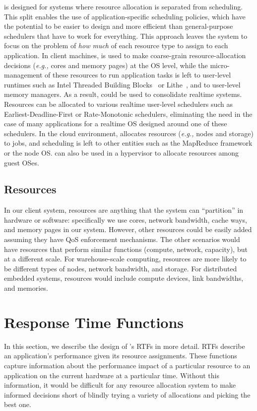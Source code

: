 \pacora is designed for systems where resource allocation is separated
from scheduling.  This split enables the use of application-specific
scheduling policies, which have the potential to be easier to design
and more efficient than general-purpose schedulers that have to work
for everything.  This approach leaves the system to focus on the
problem of \emph{how much} of each resource type to assign to each
application.  In client machines, \pacora is used to make coarse-grain
resource-allocation decisions (\emph{e.g.,} cores and memory pages) at
the OS level, while the micro-management of these resources to run
application tasks is left to user-level runtimes such as Intel
Threaded Building Blocks~\cite{CoMa08} or Lithe~\cite{lithe}, and to
user-level memory managers.
As a result, \pacora could be used to consolidate realtime systems.  Resources can be allocated to various realtime user-level schedulers such as Earliest-Deadline-First or Rate-Monotonic schedulers, eliminating the need in the case of many applications for a realtime OS designed around one of these schedulers.
In the cloud environment, \pacora allocates
resources (\emph{e.g.,} nodes and storage) to jobs, and scheduling is
left to other entities such as the MapReduce framework\cite{mapreduce}
or the node OS.  \pacora can also be used in a hypervisor to allocate
resources among guest OSes.


\subsection{Resources}

In our client system, resources are anything that the system can
``partition'' in hardware or software: specifically we use cores,
network bandwidth, cache ways, and memory pages in our system.
However, other resources could be easily added assuming they have QoS
enforcement mechanisms.  The other scenarios would have resources that
perform similar functions (compute, network, capacity), but at a
different scale. For warehouse-scale computing, resources are more
likely to be different types of nodes, network bandwidth, and
storage. For distributed embedded systems, resources would include
compute devices, link bandwidths, and memories.

\section{Response Time Functions}\label{RTFs}

In this section, we describe the design of \pacora's RTFs in more detail.
RTFs describe an application's performance given its resource assignments.  These functions capture information about the performance impact of a particular resource to an application on the current hardware at a particular time. Without this information, it would be difficult for any resource allocation system to make informed decisions short of blindly trying a variety of allocations and picking the best one.

